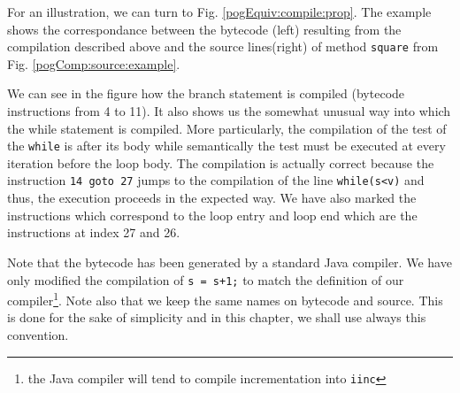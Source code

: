 For an illustration, we can turn to Fig. \ref{pogEquiv:compile:prop}.
The example shows the correspondance between  the bytecode (left) resulting from the compilation described above and the source lines(right)
 of method  \lstinline!square! from Fig. \ref{pogComp:source:example}.

We can see in the figure how the branch statement is compiled (bytecode instructions from 4 to 11).
 It also shows us the somewhat unusual way into which 
the while statement is compiled. More particularly, the compilation of the test of the \lstinline!while! is after its body while semantically the test must be executed 
at every iteration before the loop body.  The compilation is actually correct because the instruction 
\lstinline!14 goto 27! jumps to the compilation of the line \lstinline!while(s<v)! and thus, the execution proceeds in the expected way.
 We have also marked the instructions which correspond to the loop entry and loop end  which are the instructions at index 27 and 26. 
 

Note that the bytecode has been generated by a standard Java compiler. We have only modified the compilation of  \lstinline!s = s+1;! to match the definition 
of our compiler\footnote{the Java compiler will tend to compile incrementation into \lstinline!iinc!}. Note also that we keep the same names on bytecode and source.
This is done for the sake of simplicity and in this chapter, we shall use always this convention.

